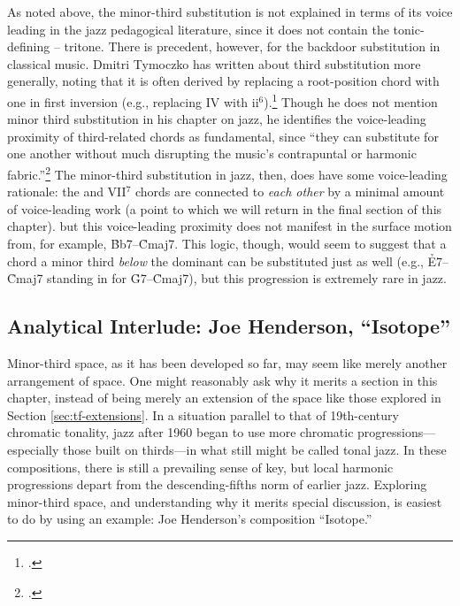 As noted above, the minor-third substitution is not explained in terms of its
voice leading in the jazz pedagogical literature, since it does not contain
the tonic-defining -- tritone. There is precedent, however, for the
backdoor substitution in classical music. Dmitri Tymoczko has written about
third substitution more generally, noting that it is often derived by
replacing a root-position chord with one in first inversion (e.g., replacing
IV with ii$^6$).\footcite[232]{tymoczko:2011} Though he does not mention
minor third substitution in his chapter on jazz, he identifies the voice-leading
proximity of third-related chords as fundamental, since ``they can substitute
for one another without much disrupting the music's contrapuntal or harmonic
fabric.''\footcite[283]{tymoczko:2011} The minor-third substitution in jazz,
then, does have some voice-leading rationale: the \V and \flat{}VII$^7$
chords are connected to \emph{each other} by a minimal amount of voice-leading
work (a point to which we will return in the final section of this chapter).
but this voice-leading proximity does not manifest in the surface motion from,
for example, \h{Bb7}--\h{Cmaj7}. This logic, though, would seem to suggest
that a chord a minor third \emph{below} the dominant can be substituted just
as well (e.g., \h{E7}--\h{Cmaj7} standing in for \h{G7}--\h{Cmaj7}), but this
progression is extremely rare in jazz.

\subsection{Analytical Interlude: Joe Henderson, “Isotope”}
\label{sec:henderson-isotope}
\FloatBarrier

Minor-third space, as it has been developed so far, may seem like merely
another arrangement of \tf space. One might reasonably ask why it merits a
section in this chapter, instead of being merely an extension of the space
like those explored in Section \ref{sec:tf-extensions}. In a situation
parallel to that of 19th-century chromatic tonality, jazz after 1960 began to
use more chromatic progressions---\allowbreak especially those built on
thirds---in what still might be called tonal jazz. In these compositions, there
is still a prevailing sense of key, but local harmonic progressions depart
from the descending-fifths norm of earlier jazz. Exploring
minor-third space, and understanding why it merits special discussion, is
easiest to do by using an example: Joe Henderson's composition
``Isotope.''

